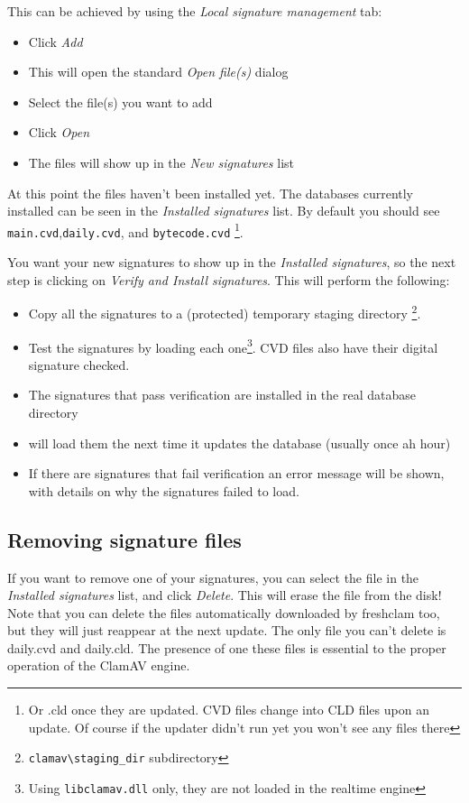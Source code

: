 This can be achieved by using the \emph{Local signature management} tab:
\begin{itemize}
\item Click \emph{Add}
\item This will open the standard \emph{Open file(s)} dialog
\item Select the file(s) you want to add
\item Click \emph{Open}
\item The files will show up in the \emph{New signatures} list
\end{itemize}

At this point the files haven't been installed yet.
The databases currently installed can be seen in the \emph{Installed signatures} list.
By default you should see \verb+main.cvd+,\verb+daily.cvd+, and \verb+bytecode.cvd+
\footnote{Or .cld once they are updated. CVD files change into CLD files upon an update.
Of course if the updater didn't run yet you won't see any files there}.

You want your new signatures to show up in the \emph{Installed signatures}, so the next step is clicking on \emph{Verify and Install signatures}.
This will perform the following:
\begin{itemize}
\item Copy all the signatures to a (protected) temporary staging directory \footnote{\texttt{clamav\textbackslash staging\_dir} subdirectory}.
\item Test the signatures by loading each one\footnote{Using \texttt{libclamav.dll} only, they are not loaded in the realtime engine}. CVD files also have their digital signature checked.
\item The signatures that pass verification are installed in the real database directory
\item \CW will load them the next time it updates the database (usually once ah hour)
\item If there are signatures that fail verification an error message will be shown, with details on why the signatures failed to load.
\end{itemize}

\subsection{Removing signature files}
\label{sec:localremove}
If you want to remove one of your signatures, you can select the file in the \emph{Installed signatures} list, and click \emph{Delete}. This will erase the file from the disk!
Note that you can delete the files automatically downloaded by \gls{freshclam} too, but they will just reappear at the next update.  The only file you can't delete is \gls{daily.cvd} and \gls{daily.cld}.
The presence of one these files is essential to the proper operation of the \gls{ClamAV} engine.

